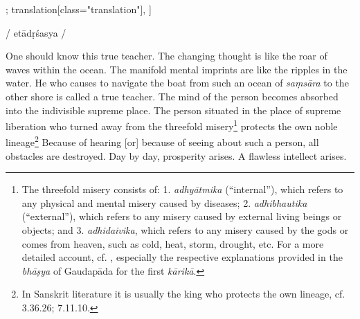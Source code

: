 \begin{alignment}[
  texts=edition[class="edition"];
  translation[class="translation"],
  ]
\begin{edition}
\begin{prose}[p58_01]
{  
  }/
etādṛśasya
/
\end{prose}
  \end{edition}
  \begin{translation}
    \begin{tlate}[p57_04]
      \noindent
One should know this true teacher. The changing thought is like the roar of waves within the ocean. The manifold mental imprints are like the ripples in the water. He who causes to navigate the boat from such an ocean of \textit{saṃsāra} to the other shore is called a true teacher. The mind of the person becomes absorbed into the indivisible supreme place. The person situated in the place of supreme liberation who turned away from the threefold misery\footnote{The threefold misery consists of: 1. \textit{adhyātmika} (``internal''), which refers to any physical and mental misery caused by diseases; 2. \textit{adhibhautika} (``external''), which refers to any misery caused by external living beings or objects; and 3. \textit{adhidaivika}, which refers to any misery caused by the gods or comes from heaven, such as cold, heat, storm, drought, etc. For a more detailed account, cf. , especially the respective explanations provided in the \textit{bhāṣya} of Gaudapāda for the first \textit{kārikā}.} protects the own noble lineage\footnote{In Sanskrit literature it is usually the king who protects the own lineage, cf.  3.36.26;  7.11.10.} Because of hearing [or] because of seeing about such a person, all obstacles are destroyed. Day by day, prosperity arises. A flawless intellect arises.

\end{tlate}
\end{translation}
\end{alignment}
